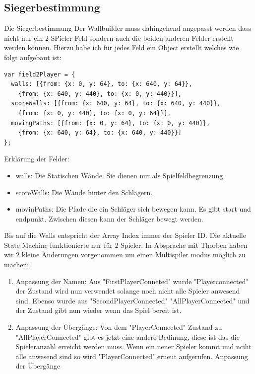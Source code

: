 \subsection{Siegerbestimmung}
Die Siegerbestimmung 
Der Wallbuilder muss dahingehend angepasst werden dass nicht nur ein 2 SPieler Feld sondern auch die beiden anderen Felder erstellt werden können.
Hierzu habe ich für jedes Feld ein Object erstellt welches wie folgt aufgebaut ist:
\begin{lstlisting}
var field2Player = {
  walls: [{from: {x: 0, y: 64}, to: {x: 640, y: 64}},
    {from: {x: 640, y: 440}, to: {x: 0, y: 440}}],
  scoreWalls: [{from: {x: 640, y: 64}, to: {x: 640, y: 440}},
    {from: {x: 0, y: 440}, to: {x: 0, y: 64}}],
  movingPaths: [{from: {x: 0, y: 64}, to: {x: 0, y: 440}},
    {from: {x: 640, y: 64}, to: {x: 640, y: 440}}]
};
\end{lstlisting}
Erklärung der Felder:
\begin{itemize}
\item
walls: Die Statischen Wände. Sie dienen nur als Spielfeldbegrenzung.
\item
scoreWalls: Die Wände hinter den Schlägern.
\item
movinPaths: Die Pfade die ein Schläger sich bewegen kann. Es gibt start und endpunkt. Zwischen diesen kann der Schläger bewegt werden.
\end{itemize}
Bis auf die Walls entspricht der Array Index immer der Spieler ID.
Die aktuelle State Machine funktionierte nur für 2 Spieler.
In Absprache mit Thorben haben wir 2 kleine Änderungen vorgenommen um einen Multispiler modus möglich zu machen:
\begin{enumerate}
\item
Anpassung der Namen: Aus "FirstPlayerConneted" wurde "Playerconnected" der Zustand wird nun verwendet solange noch nicht alle Spieler anwesend sind. Ebenso wurde aus "SecondPlayerConnected" "AllPlayerConnected" und der Zustand gibt nun wieder wenn das Spiel bereit ist.
\item
Anpassung der Übergänge: Von dem "PlayerConnected" Zustand zu "AllPlayerConnected" gibt es jetzt eine andere Bedinung, diese ist das die Spieleranzahl erreicht werden muss. Wenn ein neuer Spieler kommt und nciht alle anwesend sind so wird "PlayerConnected" erneut aufgerufen.
Anpassung der Übergänge
\end{enumerate}
